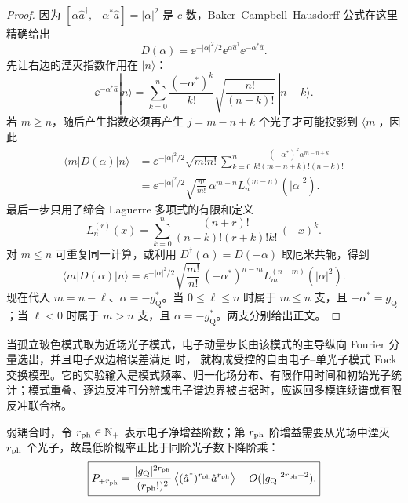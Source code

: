 \begin{proof}
因为 $[\alpha\hat a^\dagger,-\alpha^*\hat a]=|\alpha|^2$ 是 $c$ 数，Baker--Campbell--Hausdorff 公式在这里精确给出
\begin{equation*}
 D(\alpha)
 =\ee^{-|\alpha|^2/2}
 \ee^{\alpha\hat a^\dagger}\ee^{-\alpha^*\hat a}.
\end{equation*}
先让右边的湮灭指数作用在 $|n\rangle$：
\begin{equation*}
 \ee^{-\alpha^*\hat a}|n\rangle
 =\sum_{k=0}^{n}
 \frac{(-\alpha^*)^k}{k!}
 \sqrt{\frac{n!}{(n-k)!}}\,|n-k\rangle .
\end{equation*}
若 $m\ge n$，随后产生指数必须再产生
$j=m-n+k$ 个光子才可能投影到 $\langle m|$，因此
\begin{align*}
 \langle m|D(\alpha)|n\rangle
 &=\ee^{-|\alpha|^2/2}\sqrt{m!n!}
 \sum_{k=0}^{n}
 \frac{(-\alpha^*)^k\alpha^{m-n+k}}
 {k!(m-n+k)!(n-k)!}\\
 &=\ee^{-|\alpha|^2/2}
 \sqrt{\frac{n!}{m!}}\,
 \alpha^{m-n}L_n^{(m-n)}(|\alpha|^2).
\end{align*}
最后一步只用了缔合 Laguerre 多项式的有限和定义
\begin{equation*}
 L_n^{(r)}(x)
 =\sum_{k=0}^{n}
 \frac{(n+r)!}{(n-k)!(r+k)!k!}\,
 (-x)^k.
\end{equation*}
对 $m\le n$ 可重复同一计算，或利用
$D^\dagger(\alpha)=D(-\alpha)$ 取厄米共轭，得到
\begin{equation*}
 \langle m|D(\alpha)|n\rangle
 =\ee^{-|\alpha|^2/2}
 \sqrt{\frac{m!}{n!}}\,
 (-\alpha^*)^{n-m}L_m^{(n-m)}(|\alpha|^2).
\end{equation*}
现在代入 $m=n-\ell$、$\alpha=-g_{\mathrm Q}^*$。当 $0\le\ell\le n$ 时属于 $m\le n$ 支，且 $-\alpha^*=g_{\mathrm Q}$；当 $\ell<0$ 时属于 $m>n$ 支，且 $\alpha=-g_{\mathrm Q}^*$。两支分别给出正文。
\end{proof}


当孤立玻色模式取为近场光子模式，电子动量步长由该模式的主导纵向 Fourier 分量选出，并且电子双边格误差满足 时， 就构成受控的自由电子--单光子模式 Fock 交换模型。它的实验输入是模式频率、归一化场分布、有限作用时间和初始光子统计；模式重叠、逐边反冲可分辨或电子谱边界被占据时，应返回多模连续谱或有限反冲联合格。

弱耦合时，令 $r_{\rm ph}\in\mathbb N_+$ 表示电子净增益阶数；第 $r_{\rm ph}$ 阶增益需要从光场中湮灭 $r_{\rm ph}$ 个光子，故最低阶概率正比于同阶光子数下降阶乘：
\begin{equation}
\boxed{
P_{+r_{\rm ph}}
=\frac{|g_{\mathrm Q}|^{2r_{\rm ph}}}{(r_{\rm ph}!)^2}
\left\langle (\hat a^\dagger)^{r_{\rm ph}} \hat a^{r_{\rm ph}}\right\rangle
+O(|g_{\mathrm Q}|^{2r_{\rm ph}+2}).}
\label{eq:qpinem-weak-factorial-moment-dp19}
\end{equation}

